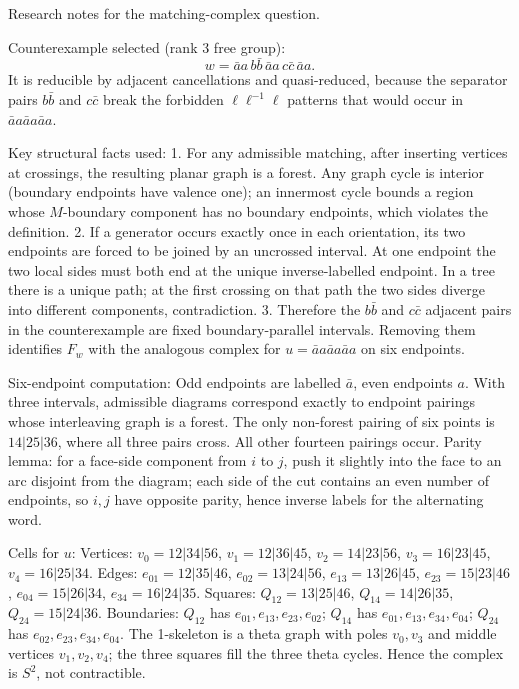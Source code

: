\documentclass{article}
\begin{document}
Research notes for the matching-complex question.

Counterexample selected (rank 3 free group):
\[
w=\bar a a\, b\bar b\, \bar a a\, c\bar c\, \bar a a.
\]
It is reducible by adjacent cancellations and quasi-reduced, because the
separator pairs \(b\bar b\) and \(c\bar c\) break the forbidden
\(\ell\ell^{-1}\ell\) patterns that would occur in
\(\bar a a\bar a a\bar a a\).

Key structural facts used:
1. For any admissible matching, after inserting vertices at crossings,
the resulting planar graph is a forest.  Any graph cycle is interior
(boundary endpoints have valence one); an innermost cycle bounds a
region whose \(M\)-boundary component has no boundary endpoints, which
violates the definition.
2. If a generator occurs exactly once in each orientation, its two
endpoints are forced to be joined by an uncrossed interval.  At one
endpoint the two local sides must both end at the unique inverse-labelled
endpoint.  In a tree there is a unique path; at the first crossing on
that path the two sides diverge into different components, contradiction.
3. Therefore the \(b\bar b\) and \(c\bar c\) adjacent pairs in the
counterexample are fixed boundary-parallel intervals.  Removing them
identifies \(F_w\) with the analogous complex for
\(u=\bar a a\bar a a\bar a a\) on six endpoints.

Six-endpoint computation:
Odd endpoints are labelled \(\bar a\), even endpoints \(a\).  With three
intervals, admissible diagrams correspond exactly to endpoint pairings
whose interleaving graph is a forest.  The only non-forest pairing of
six points is \(14|25|36\), where all three pairs cross.  All other
fourteen pairings occur.  Parity lemma: for a face-side component from
\(i\) to \(j\), push it slightly into the face to an arc disjoint from
the diagram; each side of the cut contains an even number of endpoints,
so \(i,j\) have opposite parity, hence inverse labels for the alternating
word.

Cells for \(u\):
Vertices:
\(v_0=12|34|56\), \(v_1=12|36|45\), \(v_2=14|23|56\),
\(v_3=16|23|45\), \(v_4=16|25|34\).
Edges:
\(e_{01}=12|35|46\), \(e_{02}=13|24|56\), \(e_{13}=13|26|45\),
\(e_{23}=15|23|46\), \(e_{04}=15|26|34\), \(e_{34}=16|24|35\).
Squares:
\(Q_{12}=13|25|46\), \(Q_{14}=14|26|35\), \(Q_{24}=15|24|36\).
Boundaries:
\(Q_{12}\) has \(e_{01},e_{13},e_{23},e_{02}\);
\(Q_{14}\) has \(e_{01},e_{13},e_{34},e_{04}\);
\(Q_{24}\) has \(e_{02},e_{23},e_{34},e_{04}\).
The 1-skeleton is a theta graph with poles \(v_0,v_3\) and middle
vertices \(v_1,v_2,v_4\); the three squares fill the three theta cycles.
Hence the complex is \(S^2\), not contractible.
\end{document}
